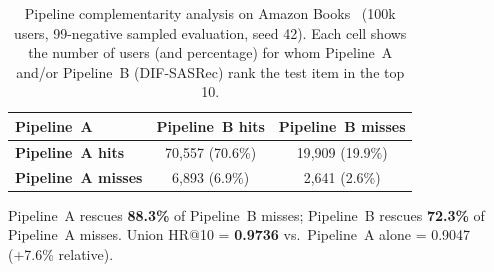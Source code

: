 \begin{table}[H]
\caption{Pipeline complementarity analysis on Amazon Books~\cite{hou2024amazon} (100k users,
         99-negative sampled evaluation, seed 42).
         Each cell shows the number of users (and percentage) for whom
         Pipeline~A and/or Pipeline~B (DIF-SASRec) rank the test item
         in the top 10.}
\label{tab:complementarity}
\centering
\begin{tabular}{lcc}
\toprule
\textbf{Pipeline~A} & \textbf{Pipeline~B hits} & \textbf{Pipeline~B misses} \\
\midrule
\textbf{Pipeline~A hits}   & 70{,}557 (70.6\%) & 19{,}909 (19.9\%) \\
\textbf{Pipeline~A misses} &  6{,}893 (6.9\%)  &  2{,}641 (2.6\%)  \\
\bottomrule
\end{tabular}
\vspace{4pt}

\noindent
Pipeline~A rescues \textbf{88.3\%} of Pipeline~B misses;
Pipeline~B rescues \textbf{72.3\%} of Pipeline~A misses.
Union HR@10 = \textbf{0.9736} vs.\ Pipeline~A alone = 0.9047
(+7.6\% relative).
\end{table}
